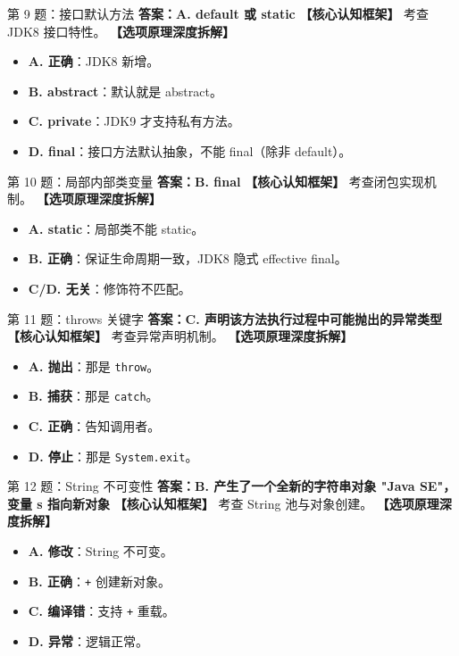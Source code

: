 ﻿\documentclass[12pt, a4paper]{ctexart}
\begin{document}
\begin{bluebox}{第 9 题：接口默认方法}
	\textbf{答案：A. default 或 static}
	\textbf{【核心认知框架】} 考查 JDK8 接口特性。
	\textbf{【选项原理深度拆解】}
	\begin{itemize}[leftmargin=*, nosep]
		\item \textbf{A. 正确}：JDK8 新增。
		\item \textbf{B. abstract}：默认就是 abstract。
		\item \textbf{C. private}：JDK9 才支持私有方法。
		\item \textbf{D. final}：接口方法默认抽象，不能 final（除非 default）。
	\end{itemize}
\end{bluebox}

\begin{bluebox}{第 10 题：局部内部类变量}
	\textbf{答案：B. final}
	\textbf{【核心认知框架】} 考查闭包实现机制。
	\textbf{【选项原理深度拆解】}
	\begin{itemize}[leftmargin=*, nosep]
		\item \textbf{A. static}：局部类不能 static。
		\item \textbf{B. 正确}：保证生命周期一致，JDK8 隐式 effective final。
		\item \textbf{C/D. 无关}：修饰符不匹配。
	\end{itemize}
\end{bluebox}

\begin{bluebox}{第 11 题：throws 关键字}
	\textbf{答案：C. 声明该方法执行过程中可能抛出的异常类型}
	\textbf{【核心认知框架】} 考查异常声明机制。
	\textbf{【选项原理深度拆解】}
	\begin{itemize}[leftmargin=*, nosep]
		\item \textbf{A. 抛出}：那是 \texttt{throw}。
		\item \textbf{B. 捕获}：那是 \texttt{catch}。
		\item \textbf{C. 正确}：告知调用者。
		\item \textbf{D. 停止}：那是 \texttt{System.exit}。
	\end{itemize}
\end{bluebox}

\begin{bluebox}{第 12 题：String 不可变性}
	\textbf{答案：B. 产生了一个全新的字符串对象 "Java SE"，变量 s 指向新对象}
	\textbf{【核心认知框架】} 考查 String 池与对象创建。
	\textbf{【选项原理深度拆解】}
	\begin{itemize}[leftmargin=*, nosep]
		\item \textbf{A. 修改}：String 不可变。
		\item \textbf{B. 正确}：\texttt{+} 创建新对象。
		\item \textbf{C. 编译错}：支持 \texttt{+} 重载。
		\item \textbf{D. 异常}：逻辑正常。
	\end{itemize}
\end{bluebox}
\end{document}
